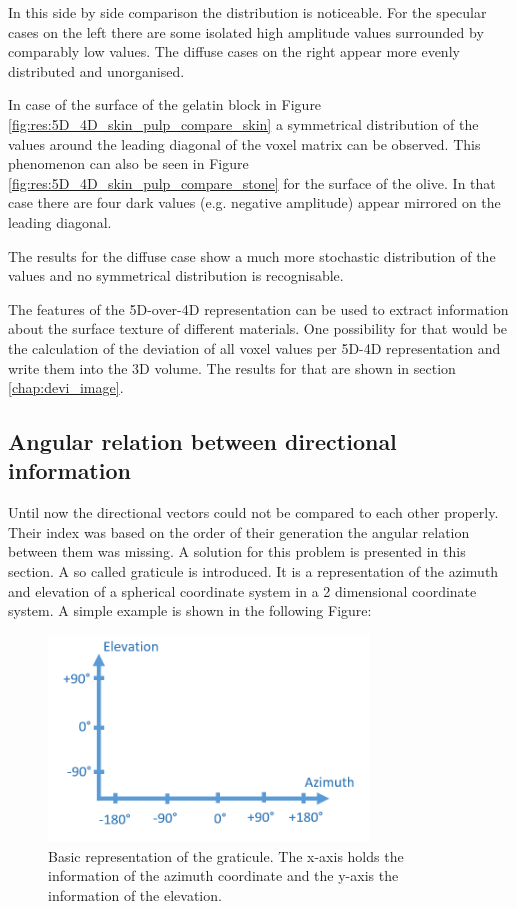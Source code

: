 In this side by side comparison the distribution is noticeable. For the specular cases on the left there are some isolated high amplitude values surrounded by comparably low values. The diffuse cases on the right appear more evenly distributed and unorganised. 

In case of the surface of the gelatin block in Figure \ref{fig:res:5D_4D_skin_pulp_compare_skin} a symmetrical distribution of the values around the leading diagonal of the voxel matrix can be observed. This phenomenon can also be seen in Figure \ref{fig:res:5D_4D_skin_pulp_compare_stone} for the surface of the olive. In that case there are four dark values (e.g. negative amplitude) appear mirrored on the leading diagonal. 

The results for the diffuse case show a much more stochastic distribution of the values and no symmetrical distribution is recognisable.


\bigskip

The features of the 5D-over-4D representation can be used to extract information about the surface texture of different materials. One possibility for that would be the calculation of the deviation of all voxel values per 5D-4D representation and write them into the 3D volume. The results for that are shown in section \ref{chap:devi_image}.






\subsection{Angular relation between directional information}
\label{angular_directional_relation}


Until now the directional vectors could not be compared to each other properly. Their index was based on the order of their generation the angular relation between them was missing. A solution for this problem is presented in this section. A so called graticule is introduced. It is a representation of the azimuth and elevation of a spherical coordinate system in a 2 dimensional coordinate system. A simple example is shown in the following Figure:

\begin{figure}[H]
    \centering
    \includegraphics[width=0.76\textwidth]{Graphics/example_gradnetz.png}
    \caption{Basic representation of the graticule. The x-axis holds the information of the azimuth coordinate and the y-axis the information of the elevation. }
    \label{fig:gadnetz_example}
\end{figure}

